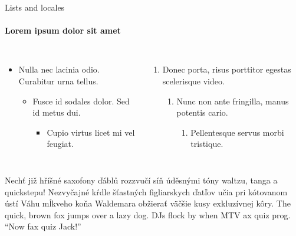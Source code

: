 \documentclass[aspectratio=169]{beamer}
\begin{document}
\begin{frame}[label=lists]{Lists and locales}
      \framesubtitle{Lorem ipsum dolor sit amet}
      \begin{columns}[onlytextwidth]
          \begin{itemize}
            \item Nulla nec lacinia odio. Curabitur urna tellus.
            \begin{itemize}
              \item Fusce id sodales dolor. Sed id metus dui.
              \begin{itemize}
                \item Cupio virtus licet mi vel feugiat.
              \end{itemize}
            \end{itemize}
          \end{itemize}
          \begin{enumerate}
            \item Donec porta, risus porttitor egestas scelerisque video.
            \begin{enumerate}
              \item Nunc non ante fringilla, manus potentis cario.
              \begin{enumerate}
                \item Pellentesque servus morbi tristique.
              \end{enumerate}
            \end{enumerate}
          \end{enumerate}
      \end{columns}
      \bigskip
      \justifying

      {Nechť již hříšné saxofony ďáblů
      rozzvučí síň úděsnými tóny waltzu, tanga a quickstepu!}
      { Nezvyčajné kŕdle šťastných figliarskych
      ďatľov učia pri kótovanom ústí Váhu mĺkveho koňa Waldemara
      obžierať väč\-šie kusy exkluzívnej kôry.}
      {The quick, brown fox jumps over a lazy
      dog. DJs flock by when MTV ax quiz prog. “Now fax quiz Jack!”}
\end{frame}
\end{document}
